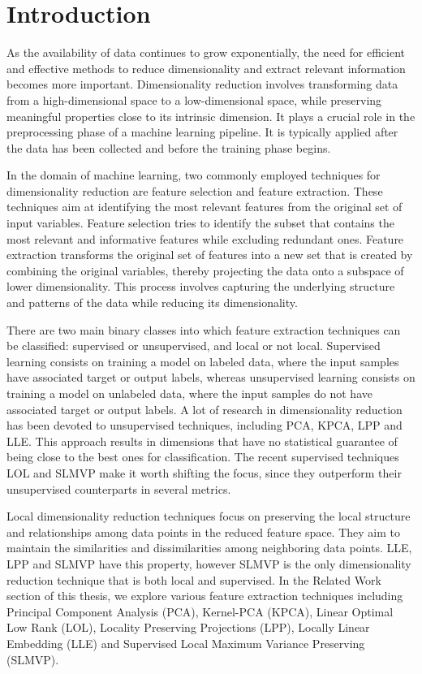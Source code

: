 \chapter{Introduction}

As the availability of data continues to grow exponentially, the need for efficient and effective methods to reduce dimensionality and extract relevant information becomes more important.
Dimensionality reduction involves transforming data from a high-dimensional space to a low-dimensional space, while preserving meaningful properties close to its intrinsic dimension. It plays a crucial role in the preprocessing phase of a machine learning pipeline. It is typically applied after the data has been collected and before the training phase begins.

In the domain of machine learning, two commonly employed techniques for dimensionality reduction are feature selection and feature extraction. These techniques aim at identifying the most relevant features from the original set of input variables.
Feature selection tries to identify the subset that contains the most relevant and informative features while excluding redundant ones.
Feature extraction transforms the original set of features into a new set that is created by combining the original variables, thereby projecting the data onto a subspace of lower dimensionality. This process involves capturing the underlying structure and patterns of the data while reducing its dimensionality.

There are two main binary classes into which feature extraction techniques can be classified: supervised or unsupervised, and local or not local.
Supervised learning consists on training a model on labeled data, where the input samples have associated target or output labels, whereas unsupervised learning consists on training a model on unlabeled data, where the input samples do not have associated target or output labels. A lot of research in dimensionality reduction has been devoted to unsupervised techniques, including PCA, KPCA, LPP and LLE. This approach results in dimensions that have no statistical guarantee of being close to the best ones for classification. The recent supervised techniques LOL and SLMVP make it worth shifting the focus, since they outperform their unsupervised counterparts in several metrics.

Local dimensionality reduction techniques focus on preserving the local structure and relationships among data points in the reduced feature space. They aim to maintain the similarities and dissimilarities among neighboring data points. LLE, LPP and SLMVP have this property, however SLMVP is the only dimensionality reduction technique that is both local and supervised.
In the Related Work section of this thesis, we explore various feature extraction techniques including Principal Component Analysis \cite{pca} (PCA), Kernel-PCA \cite{kpca} (KPCA), Linear Optimal Low Rank \cite{lol} (LOL), Locality Preserving Projections \cite{lpp} (LPP), Locally Linear Embedding \cite{lle} (LLE) and Supervised Local Maximum Variance Preserving \cite{slmvp} (SLMVP).

